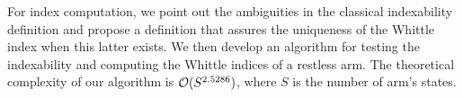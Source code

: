 For index computation, we point out the ambiguities in the classical indexability definition and propose a definition that assures the uniqueness of the Whittle index when this latter exists. %
We then develop an algorithm for testing the indexability and computing the Whittle indices of a restless arm.
The theoretical complexity of our algorithm is $\mathcal{O}(S^{2.5286})$, where $S$ is the number of arm's states.


